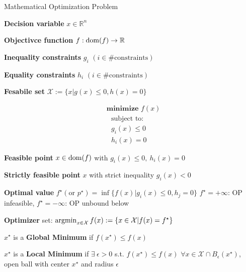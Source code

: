 


\begin{sstTitleBox}[Plum]{
		Mathematical Optimization Problem
	}
	\begin{minipage}{0.70\linewidth}
		\begin{sstOnlyFrame}[Plum]
			\textbf{Decision variable} $x  \in \mathbb{R}^{n}$

			\textbf{Objectivce function} $f: \operatorname{dom}(f)\to\mathbb{R}$

			\textbf{Inequality constraints} $g_i$
			$\scriptstyle(i \in \#\text{constraints})$

			\textbf{Equality constraints} $h_i$
			$\scriptstyle(i \in \#\text{constraints})$

			\textbf{Fesabile set}
			$\mathcal{X}\!\!:=\!\!\{x|g(x)\!\!\le\!\!0,\!h(x)\!=\!0\}$
		\end{sstOnlyFrame}
	\end{minipage}
	\begin{minipage}{0.28\linewidth}
		\begin{sstFullFrame}[Plum]
			{\color{white}
				\vspace{-1mm}
				\[ \begin{aligned}
						 & \textbf{minimize }f(x)   \\
						 & \ \ \ \text{subject to:} \\
						 & \ \ \ g_i(x)  \le 0      \\
						 & \ \ \ h_i(x)  = 0
					\end{aligned} \]
				\vspace{-1mm}
			}
		\end{sstFullFrame}
	\end{minipage}

	\begin{sstOnlyFrame}[Plum]
		\textbf{Feasible point}
		$x\in\operatorname{dom}(f)$ with
		$g_i(x)\le 0,\ h_i(x)=0$

		\textbf{Strictly feasible point}
		$x$ with strict inequality
		$g_i(x)<0$

		\textbf{Optimal value}
		$f^\star (\text{or } p^\star)=
			\inf\{f(x)|
			g_i(x)\le0,h_j=0 \}$
		$f^\star=+\infty$: OP infeasible,
		$f^\star=-\infty$: OP unbound below

		\textbf{Optimizer}
		set:
		$\operatorname{argmin}_{x \in \mathcal{X}} f(x):=
			\{ x\in\mathcal{X}|f(x)=f^\star\}$
	\end{sstOnlyFrame}

	\begin{sstOnlyFrame}[Plum]
		$x^\star$ is a \textbf{Global Minimum} if $f(x^\star)\leq f(x)$

		$x^\star$ is a \textbf{Local Minimum} if
		$\exists\ \epsilon > 0$ s.t.
		$f(x^\star)\leq f(x)$
		$\forall x \in \mathcal{X} \cap B_\epsilon(x^\star)$,
		open ball with center $x^\star$ and radius $\epsilon$
	\end{sstOnlyFrame}
\end{sstTitleBox}


